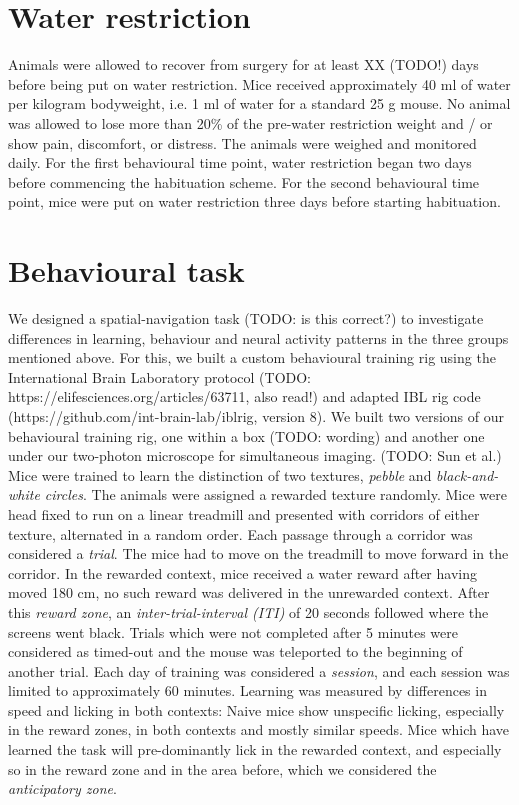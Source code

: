 \section{Water restriction}
Animals were allowed to recover from surgery for at least XX (TODO!) days before being put on water restriction. Mice received approximately 40 ml of water per kilogram bodyweight, i.e. 1 ml of water for a standard 25 g mouse. No animal was allowed to lose more than 20\% of the pre-water restriction weight and / or show pain, discomfort, or distress. The animals were weighed and monitored daily.
For the first behavioural time point, water restriction began two days before commencing the habituation scheme. For the second behavioural time point, mice were put on water restriction three days before starting habituation.
\section{Behavioural task}
We designed a spatial-navigation task (TODO: is this correct?) to investigate differences in learning, behaviour and neural activity patterns in the three groups mentioned above.
For this, we built a custom behavioural training rig using the International Brain Laboratory protocol (TODO: https://elifesciences.org/articles/63711, also read!) and adapted IBL rig code (https://github.com/int-brain-lab/iblrig, version 8).
We built two versions of our behavioural training rig, one within a box (TODO: wording) and another one under our two-photon microscope for simultaneous imaging.
(TODO: Sun et al.) Mice were trained to learn the distinction of two textures, \textit{pebble} and \textit{black-and-white circles}. The animals were assigned a rewarded texture randomly.  Mice were head fixed to run on a linear treadmill and presented with corridors of either texture, alternated in a random order. Each passage through a corridor was considered a \textit{trial}. The mice had to move on the treadmill to move forward in the corridor. In the rewarded context, mice received a water reward after having moved 180 cm, no such reward was delivered in the unrewarded context. After this \textit{reward zone}, an \textit{inter-trial-interval (ITI)} of 20 seconds followed where the screens went black. Trials which were not completed after 5 minutes were considered as timed-out and the mouse was teleported to the beginning of another trial. Each day of training was considered a \textit{session}, and each session was limited to approximately 60 minutes.
Learning was measured by differences in speed and licking in both contexts: Naive mice show unspecific licking, especially in the reward zones, in both contexts and mostly similar speeds. Mice which have learned the task will pre-dominantly lick in the rewarded context, and especially so in the reward zone and in the area before, which we considered the \textit{anticipatory zone}.
